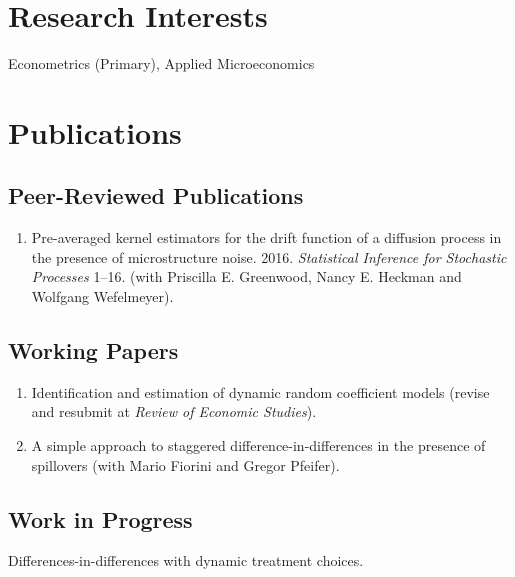 \documentclass[10pt,letterpaper]{article}
\renewenvironment{itemize}{
  \begin{list}{}{
      \setlength{\leftmargin}{1.5em}
      \setlength{\itemsep}{0.25em}
      \setlength{\parskip}{0pt}
      \setlength{\parsep}{0.25em}
    }
}{
  \end{list}
}
\begin{document}
\section*{Research Interests}

Econometrics (Primary), Applied Microeconomics

\section*{Publications}

\subsection*{Peer-Reviewed Publications}

\begin{enumerate}
\item
  Pre-averaged kernel estimators for the drift function of a diffusion process in the presence of microstructure noise. 
  2016.
  \textit{Statistical Inference for Stochastic Processes} 1--16.
  (with Priscilla E. Greenwood, Nancy E. Heckman and Wolfgang Wefelmeyer).
\end{enumerate}

\subsection*{Working Papers}

\begin{enumerate}[resume]
\item Identification and estimation of dynamic random coefficient models (revise and resubmit at \emph{Review of Economic Studies}).
\item A simple approach to staggered difference-in-differences in the presence of spillovers (with Mario Fiorini and Gregor Pfeifer).

\end{enumerate}

\subsection*{Work in Progress}

\begin{itemize}
\item Differences-in-differences with dynamic treatment choices.
\end{itemize}
\end{document}
